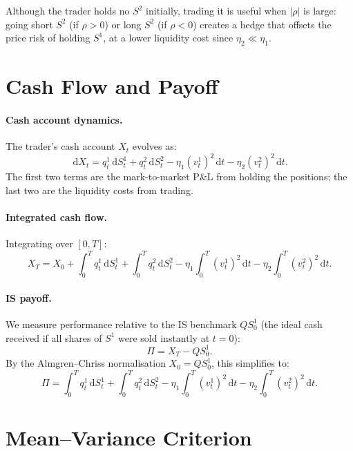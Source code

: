 \documentclass[12pt, a4paper]{article}
\newcommand{\dd}{\,\mathrm{d}}
\begin{document}
\begin{notebox}
  Although the trader holds no $S^2$ initially, trading it is useful when
  $|\rho|$ is large: going short $S^2$ (if $\rho > 0$) or long $S^2$
  (if $\rho < 0$) creates a hedge that offsets the price risk of holding $S^1$,
  at a lower liquidity cost since $\eta_2 \ll \eta_1$.
\end{notebox}

\section{Cash Flow and Payoff}

\paragraph{Cash account dynamics.}
The trader's cash account $X_t$ evolves as:
\[
  \dd X_t
  = q^1_t \dd S^1_t + q^2_t \dd S^2_t
  - \eta_1 (v^1_t)^2 \dd t - \eta_2 (v^2_t)^2 \dd t.
\]
The first two terms are the mark-to-market P\&L from holding the positions;
the last two are the liquidity costs from trading.

\paragraph{Integrated cash flow.}
Integrating over $[0,T]$:
\[
  X_T = X_0
  + \int_0^T q^1_t \dd S^1_t
  + \int_0^T q^2_t \dd S^2_t
  - \eta_1\int_0^T (v^1_t)^2 \dd t
  - \eta_2\int_0^T (v^2_t)^2 \dd t.
\]

\paragraph{IS payoff.}
We measure performance relative to the IS benchmark $QS^1_0$
(the ideal cash received if all shares of $S^1$ were sold instantly at $t=0$):
\[
  \Pi = X_T - QS^1_0.
\]
By the Almgren--Chriss normalisation $X_0 = QS^1_0$, this simplifies to:
\[
  \Pi
  = \int_0^T q^1_t \dd S^1_t
  + \int_0^T q^2_t \dd S^2_t
  - \eta_1\int_0^T (v^1_t)^2 \dd t
  - \eta_2\int_0^T (v^2_t)^2 \dd t.
\]

\section{Mean--Variance Criterion}
\end{document}
